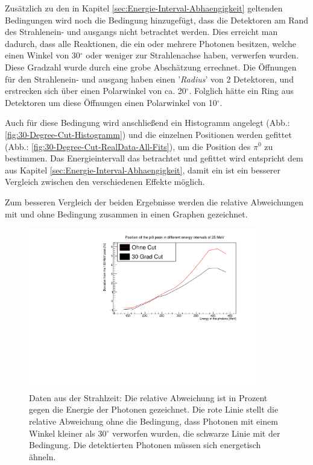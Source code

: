 \documentclass[a4paper,11pt,oneside,final,german,openbib,pdftex]{scrbook}
\begin{document}
{%

Zus\"atzlich zu den in Kapitel \ref{sec:Energie-Interval-Abhaengigkeit} geltenden Bedingungen wird noch die Bedingung hinzugef\"ugt, dass die Detektoren am Rand des Strahlenein- und ausgangs nicht betrachtet werden. Dies erreicht man dadurch, dass alle Reaktionen, die ein oder mehrere Photonen besitzen, welche einen Winkel von 30$^{\circ}$ oder weniger zur Strahlenachse haben, verwerfen wurden. Diese Gradzahl wurde durch eine grobe Absch\"atzung errechnet. Die \"Offnungen f\"ur den Strahlenein- und ausgang haben einen '\textit{Radius}' von 2 Detektoren, und erstrecken sich \"uber einen Polarwinkel von ca. 20$^{\circ}$. Folglich h\"atte ein Ring aus Detektoren um diese \"Offnungen einen Polarwinkel von 10$^{\circ}$. 
 
Auch f\"ur diese Bedingung wird anschlie{\ss}end ein Histogramm angelegt (Abb.: \ref{fig:30-Degree-Cut-Histogramm}) und die einzelnen Positionen werden gefittet (Abb.: \ref{fig:30-Degree-Cut-RealData-All-Fits}), um die Position des $\pi^0$ zu bestimmen. Das Energieintervall das betrachtet und gefittet wird entspricht dem aus Kapitel \ref{sec:Energie-Interval-Abhaengigkeit}, damit ein ist ein besserer Vergleich zwischen den verschiedenen Effekte m\"oglich.

Zum besseren Vergleich der beiden Ergebnisse werden die relative Abweichungen mit und ohne Bedingung zusammen in einen Graphen gezeichnet.
\begin{figure}[h!]
	\begin{center}
		\includegraphics[width=100mm]{NewCalib/Strahlzeit2014/20171904RealBothDeviation}
		\caption[Strahlzeit: Symmetrische Photonen; Vernachl\"assigung der Detektoren am Rand; Abweichung]{Daten aus der Strahlzeit: Die relative Abweichung ist in Prozent gegen die Energie der Photonen gezeichnet. Die rote Linie stellt die relative Abweichung ohne die Bedingung, dass Photonen mit einem Winkel kleiner als 30$^{\circ}$ verworfen wurden, die schwarze Linie mit der Bedingung. Die detektierten Photonen m\"ussen sich energetisch \"ahneln.}
		\label{fig:Vernachlaessigung-Detektoren-am-Rand}
	\end{center}
\end{figure}

}
\end{document}
